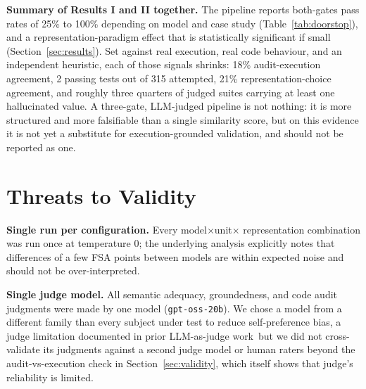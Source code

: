\documentclass[conference]{IEEEtran}
\begin{document}

  \textbf{Summary of Results I and II together.} The pipeline reports
  both-gates pass rates of 25\% to 100\% depending on model and case study
  (Table~\ref{tab:doorstop}), and a representation-paradigm effect that is
  statistically significant if small (Section~\ref{sec:results}). Set against real
  execution, real code behaviour, and an independent heuristic, each of those
  signals shrinks: 18\% audit-execution agreement, 2 passing tests out of
  315 attempted, 21\% representation-choice agreement, and roughly three quarters of
  judged suites carrying at least one hallucinated value. A three-gate, LLM-judged
  pipeline is not nothing: it is more structured and more falsifiable than a
  single similarity score, but on this evidence it is not yet a substitute
  for execution-grounded validation, and should not be reported as one.

  \section{Threats to Validity}
  \label{sec:threats}

  \textbf{Single run per configuration.} Every model$\times$unit$\times$
  representation combination was run once at temperature 0; the underlying
  analysis explicitly notes that differences of a few FSA points between models
  are within expected noise and should not be over-interpreted.

  \textbf{Single judge model.} All semantic adequacy, groundedness, and code
  audit judgments were made by one model (\texttt{gpt-oss-20b}). We chose a
  model from a different family than every subject under test to reduce
  self-preference bias, a judge limitation documented in prior LLM-as-judge
  work~\cite{zheng2023judging}but we did not cross-validate its judgments against a
  second judge model or human raters beyond the audit-vs-execution check in
  Section~\ref{sec:validity}, which itself shows that judge's reliability is
  limited.
\end{document}
